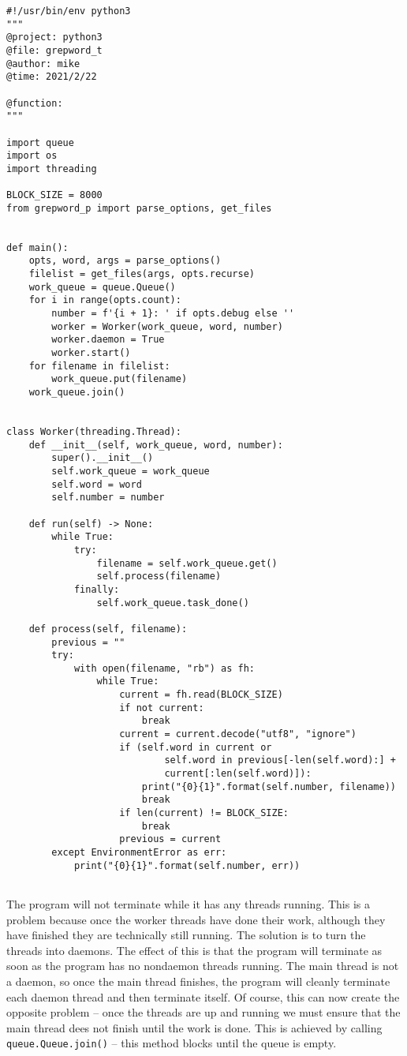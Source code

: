 \begin{lstlisting}
#!/usr/bin/env python3
"""
@project: python3
@file: grepword_t
@author: mike
@time: 2021/2/22
 
@function:
"""

import queue
import os
import threading

BLOCK_SIZE = 8000
from grepword_p import parse_options, get_files


def main():
    opts, word, args = parse_options()
    filelist = get_files(args, opts.recurse)
    work_queue = queue.Queue()
    for i in range(opts.count):
        number = f'{i + 1}: ' if opts.debug else ''
        worker = Worker(work_queue, word, number)
        worker.daemon = True
        worker.start()
    for filename in filelist:
        work_queue.put(filename)
    work_queue.join()


class Worker(threading.Thread):
    def __init__(self, work_queue, word, number):
        super().__init__()
        self.work_queue = work_queue
        self.word = word
        self.number = number

    def run(self) -> None:
        while True:
            try:
                filename = self.work_queue.get()
                self.process(filename)
            finally:
                self.work_queue.task_done()

    def process(self, filename):
        previous = ""
        try:
            with open(filename, "rb") as fh:
                while True:
                    current = fh.read(BLOCK_SIZE)
                    if not current:
                        break
                    current = current.decode("utf8", "ignore")
                    if (self.word in current or
                            self.word in previous[-len(self.word):] +
                            current[:len(self.word)]):
                        print("{0}{1}".format(self.number, filename))
                        break
                    if len(current) != BLOCK_SIZE:
                        break
                    previous = current
        except EnvironmentError as err:
            print("{0}{1}".format(self.number, err))
  
\end{lstlisting}

The program will not terminate while it has any threads running.
This is a problem because once the worker threads have done their work, although they have finished they are technically still running.
The solution is to turn the threads into daemons.
The effect of this is that the program will terminate as soon as the program has no nondaemon threads running.
The main thread is not a daemon, so once the main thread finishes, the program will cleanly terminate each daemon thread and then terminate itself.
Of course, this can now create the opposite problem -- once the threads are up and running we must ensure that the main thread dees not finish until the work is done.
This is achieved by calling \verb|queue.Queue.join()| -- this method blocks until the queue is empty.



